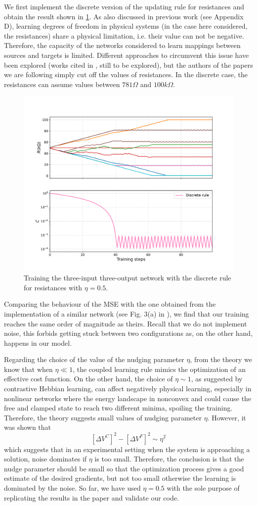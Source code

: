\documentclass[10.5pt]{article}
\begin{document}
We first implement the discrete version of the updating rule for resistances and obtain the result shown in \cref{fig:general_training_discrete}. As also discussed in previous work (see \cite{Stern} Appendix D), learning degrees of freedom in physical systems (in the case here considered, the resistances) share a physical limitation, i.e. their value can not be negative. Therefore, the capacity of the networks considered to learn mappings between sources and targets is limited. Different approaches to circumvent this issue have been explored (works cited in \cite{Stern}, still to be explored), but the authors of the papers we are following simply cut off the values of resistances. In the discrete case, the resistances can assume values between $781\Omega$ and $100k\Omega$.
\begin{figure}[h]
    \centering
    \includegraphics[width=0.5\columnwidth]{../figures_tex/general_training_discrete.pdf}
    \caption{Training the three-input three-output network with the discrete rule for resistances with $\eta = 0.5$.}
    \label{fig:general_training_discrete}
\end{figure}

Comparing the behaviour of the MSE with the one obtained from the implementation of a similar network (see Fig. 3(a) in \cite{Dillavou}), we find that our training reaches the same order of magnitude as theirs. Recall that we do not implement noise, this forbids getting stuck between two configurations as, on the other hand, happens in our model.

Regarding the choice of the value of the nudging parameter $\eta$, from the theory \cite{Stern} we know that when $\eta \ll 1$, the coupled learning rule mimics the optimization of an effective cost function. On the other hand, the choice of $\eta \sim 1$, as suggested by contrastive Hebbian learning, can affect negatively physical learning, especially in nonlinear networks where the energy landscape in nonconvex and could cause the free and clamped state to reach two different minima, spoiling the training. Therefore, the theory suggests small values of nudging parameter $\eta$. However, it was shown \cite{Stern} that
\[
\left[ \Delta V^C \right]^2 - \left[ \Delta V^F \right]^2 \sim \eta^2
\]
which suggests that in an experimental setting when the system is approaching a solution, noise dominates if $\eta$ is too small. Therefore, the conclusion is that the nudge parameter should be small so that the optimization process gives a good estimate of the desired gradients, but not too small otherwise the learning is dominated by the noise. So far, we have used $\eta = 0.5$ with the sole purpose of replicating the results in the paper and validate our code. 
\end{document}
